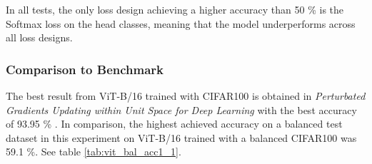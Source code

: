 In all tests, the only loss design achieving a higher accuracy than 50 \% is the Softmax loss on the head classes, meaning that the model underperforms across all loss designs.

\subsubsection{Comparison to Benchmark}
The best result from ViT-B/16 trained with CIFAR100 is obtained in \textit{Perturbated Gradients Updating within Unit Space for Deep Learning} \cite{Tseng_2022} with the best accuracy of 93.95 \% . In comparison, the highest achieved accuracy on a balanced test dataset in this experiment on ViT-B/16 trained with a balanced CIFAR100 was 59.1 \%. See table \ref{tab:vit_bal_acc1_1}. 





